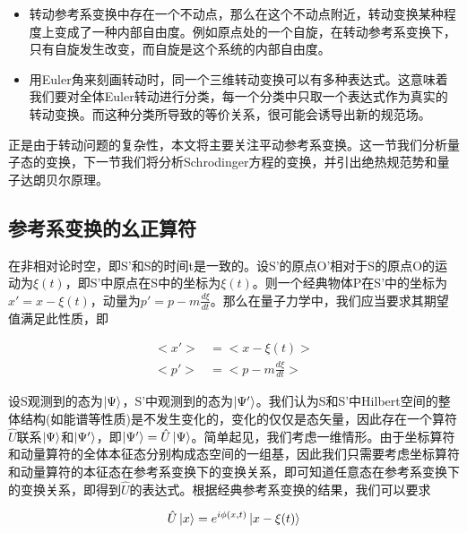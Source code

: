 \documentclass[a4paper]{article}
\begin{document}
        \begin{itemize}
            \item 转动参考系变换中存在一个不动点，那么在这个不动点附近，转动变换某种程度上变成了一种内部自由度。例如原点处的一个自旋，在转动参考系变换下，只有自旋发生改变，而自旋是这个系统的内部自由度。
            \item 用Euler角来刻画转动时，同一个三维转动变换可以有多种表达式。这意味着我们要对全体Euler转动进行分类，每一个分类中只取一个表达式作为真实的转动变换。而这种分类所导致的等价关系，很可能会诱导出新的规范场。
        \end{itemize}
        
        正是由于转动问题的复杂性，本文将主要关注平动参考系变换。这一节我们分析量子态的变换，下一节我们将分析Schrodinger方程的变换，并引出绝热规范势和量子达朗贝尔原理。


    \subsection{参考系变换的幺正算符}
    
        在非相对论时空，即S'和S的时间t是一致的。设S'的原点O'相对于S的原点O的运动为$\xi(t)$，即S'中原点在S中的坐标为$\xi(t)$。则一个经典物体P在S'中的坐标为$x'=x-\xi(t)$，动量为$p'=p-m\frac{d\xi}{dt}$。那么在量子力学中，我们应当要求其期望值满足此性质，即
    
        \begin{equation}\label{classical-translation}
            \begin{split}
                <x'>&=<x-\xi(t)>      \\
                <p'>&=<p-m\frac{d\xi}{dt}>
            \end{split}
        \end{equation}
    
        设S观测到的态为$\ket{\Psi}$，S'中观测到的态为$\ket{\Psi'}$。我们认为S和S'中Hilbert空间的整体结构(如能谱等性质)是不发生变化的，变化的仅仅是态矢量，因此存在一个算符$\hat{U}$联系$\ket{\Psi}$和$\ket{\Psi'}$，即$\ket{\Psi'}=\hat{U}\ket{\Psi}$。简单起见，我们考虑一维情形。由于坐标算符和动量算符的全体本征态分别构成态空间的一组基，因此我们只需要考虑坐标算符和动量算符的本征态在参考系变换下的变换关系，即可知道任意态在参考系变换下的变换关系，即得到$\hat{U}$的表达式。根据经典参考系变换的结果，我们可以要求

        \begin{equation}
            \hat{U}\ket{x}=e^{i\phi(x,t)}\ket{x-\xi(t)}
        \end{equation}
\end{document}
